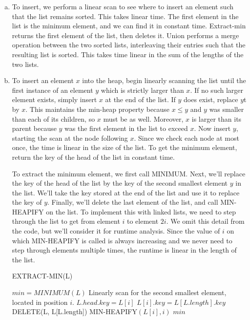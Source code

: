 \documentclass{article}
\begin{document}
\begin{enumerate}[a.]
\item 
To insert, we perform a linear scan to see where to insert an element such that the list remains sorted. This takes linear time. The first element in the list is the minimum element, and we can find it in constant time. Extract-min returns the first element of the list, then deletes it.  Union performs a merge operation between the two sorted lists, interleaving their entries such that the resulting list is sorted.  This takes time linear in the sum of the lengths of the two lists. 

\item 
To insert an element $x$ into the heap, begin linearly scanning the list until the first instance of an element $y$ which is strictly larger than $x$.  If no such larger element exists, simply insert $x$ at the end of the list.  If $y$ does exist, replace $y$t by $x$.  This maintains the min-heap property because $x \leq y$ and $y$ was smaller than each of its children, so $x$ must be as well.  Moreover, $x$ is larger than its parent because $y$ was the first element in the list to exceed $x$.  Now insert $y$, starting the scan at the node following $x$.   Since we check each node at most once, the time is linear in the size of the list.  To get the minimum element, return the key of the head of the list in constant time.  

To extract the minimum element, we first call MINIMUM.  Next, we'll replace the key of the head of the list by the key of the second smallest element $y$ in the list.  We'll take the key stored at the end of the list and use it to replace the key of $y$.  Finally, we'll delete the last element of the list, and call MIN-HEAPIFY on the list.  To implement this with linked lists, we need to step through the list to get from element $i$ to element $2i$.  We omit this detail from the code, but we'll consider it for runtime analysis.  Since the value of $i$ on which MIN-HEAPIFY is called is always increasing and we never need to step through elements multiple times, the runtime is linear in the length of the list.

\begin{algorithm}
\caption{EXTRACT-MIN(L)}
\begin{algorithmic}
\State $min = MINIMUM(L)$
\State Linearly scan for the second smallest element, located in position $i$.
\State $L.head.key = L[i]$
\State $L[i].key = L[L.length].key$
\State DELETE(L, L[L.length])
\State MIN-HEAPIFY$(L[i],i)$
\State \Return $min$
\end{algorithmic}
\end{algorithm}


\end{enumerate}
\end{document}

